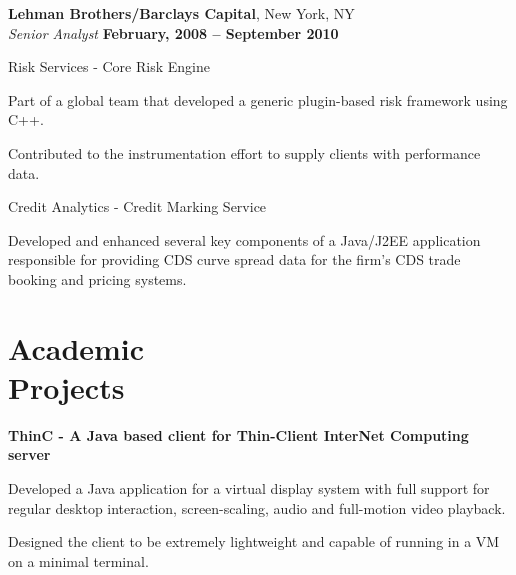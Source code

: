 \documentclass[margin,line]{resume}
\begin{document}
\begin{resume}
  {\bf Lehman Brothers/Barclays Capital}, New York, NY \vspace{1mm}\\\vspace{1mm}%
    {\sl Senior Analyst} \hfill {\bf February, 2008 -- September 2010}\\
    \vspace{-3mm}
    \begin{list2}
     \item Risk Services - Core Risk Engine
        		\begin{list3}
			\item Part of a global team that developed a generic plugin-based risk framework using C++. 
			\item Contributed to the instrumentation effort to supply clients with performance data. 
		\end{list3}
        \item Credit Analytics - Credit Marking Service
        		\begin{list3}
			\item Developed and enhanced several key components of a Java/J2EE application responsible for providing CDS curve spread data for the firm's CDS trade booking and pricing systems. 
        		\end{list3}
    \end{list2}

\vspace*{-2mm}                 
         
    \section{\mysidestyle Academic\\Projects}	          
      {\bf ThinC - A Java based client for Thin-Client InterNet Computing server} \vspace{2mm}
      \begin{list2}
	\item Developed a Java application for a virtual display system with full support for regular desktop interaction, screen-scaling, audio and full-motion video playback. 
	\item Designed the client to be extremely lightweight and capable of running in a VM on a minimal terminal. 
       \end{list2}        


\vspace*{-2mm}    
       

\end{resume}
\end{document}
